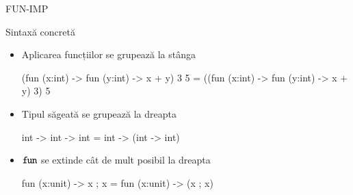 \documentclass[xcolor=pdftex,romanian,colorlinks]{beamer}
\begin{document}
\begin{section}{FUN-IMP}
\begin{frame}[fragile]{Sintaxă concretă}
\begin{itemize}
\item Aplicarea funcțiilor se grupează la stânga
\begin{asciiml}
(fun (x:int) -> fun (y:int) -> x + y) 3 5  
  = ((fun (x:int) -> fun (y:int) -> x + y) 3) 5 
\end{asciiml}
\item Tipul săgeată se grupează la dreapta
\begin{asciiml}
int -> int -> int  = int -> (int -> int) 
\end{asciiml}
\item $\mathrel{\text{\ttfamily fun}}$ se extinde cât de mult posibil la dreapta
\begin{asciiml}
fun (x:unit) -> x ; x   = fun (x:unit) -> (x ; x)
\end{asciiml}
\end{itemize}
\end{frame}

\end{section}
\end{document}
